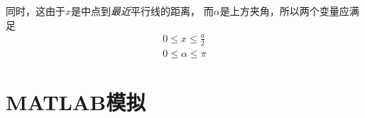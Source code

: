 \documentclass[10pt,a4paper,column,twoside,UTF8]{ctexart}
\begin{document}
		同时，这由于$x$是中点到\emph{最近}平行线的距离，
		而$\alpha$是上方夹角，所以两个变量应满足
		\begin{gather}
			0 \leq x \leq \frac{a}{2}\\
			0 \leq \alpha \leq \pi
		\end{gather}


	\section{MATLAB模拟}




\end{document}
